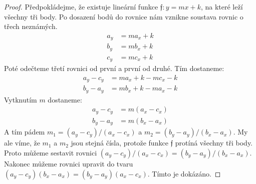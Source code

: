 \begin{proof}
  Předpokládejme, že existuje lineární funkce $\mathfrak{f}: y = mx+k$, na které leží všechny tři body. Po dosazení bodů do rovnice nám vznikne soustava rovnic o třech neznámých.
  \begin{align*}
    a_y & = ma_x+k \\
    b_y & = mb_x+k \\
    c_y & = mc_x+k
  \end{align*}
  Poté odečteme třetí rovnici od první a první od druhé. Tím dostaneme:
  \begin{align*}
    a_y-c_y & = ma_x+k - mc_x -k \\
    b_y-a_y & = mb_x+k -ma_x -k
  \end{align*}
  Vytknutím $m$ dostaneme:
  \begin{align*}
    a_y-c_y & = m(a_x-c_x) \\
    b_y-a_y & = m(b_x-a_x)
  \end{align*}
  A tím pádem $m_1 = (a_y-c_y)/(a_x-c_x)$ a $ m_2=(b_y-a_y)/(b_x-a_x)$. My ale víme, že $m_1$ a $m_2$ jsou stejná čísla, protože funkce $\mathfrak{f}$ protíná všechny tři body. Proto můžeme sestavit rovnici $(a_y-c_y)/(a_x-c_x) = (b_y-a_y)/(b_x-a_x)$. Nakonec můžeme rovnici upravit do tvaru $(a_y-c_y)(b_x-a_x) = (b_y-a_y)(a_x-c_x)$. Tímto je  dokázáno.
\end{proof}